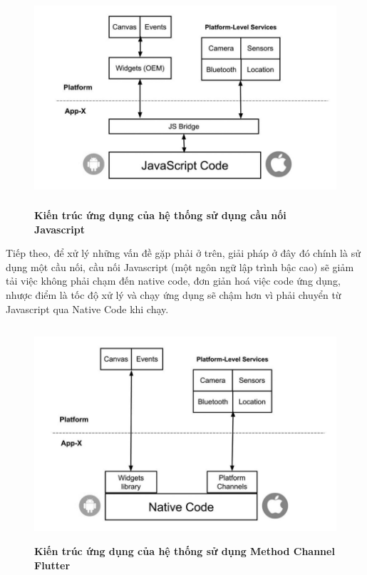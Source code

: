 \begin{figure}[H]
  \centering
  \includegraphics[width=15cm,height=8cm]{Images/system/flutter_JS.png}
  \caption[Kiến trúc ứng dụng của hệ thống sử dụng cầu nối Javascript]{\bfseries \fontsize{12pt}{0pt}
  \selectfont Kiến trúc ứng dụng của hệ thống sử dụng cầu nối Javascript}
  \label{flutter_JS} %
\end{figure}

Tiếp theo, để xử lý những vấn đề gặp phải ở trên, giải pháp ở đây đó chính là sử dụng một cầu nối, cầu nối Javascript (một ngôn ngữ lập trình bậc cao)
sẽ giảm tải việc không phải chạm đến native code, đơn giản hoá việc code ứng dụng, nhược điểm là tốc độ xử lý và chạy ứng
dụng sẽ chậm hơn vì phải chuyển từ Javascript qua Native Code khi chạy. 

\begin{figure}[H]
  \centering
  \includegraphics[width=15cm,height=8cm]{Images/system/flutter_dart.png}
  \caption[Kiến trúc ứng dụng của hệ thống sử dụng Method Channel Flutter]{\bfseries \fontsize{12pt}{0pt}
  \selectfont Kiến trúc ứng dụng của hệ thống sử dụng Method Channel Flutter}
  \label{flutter_dart} %
\end{figure}

